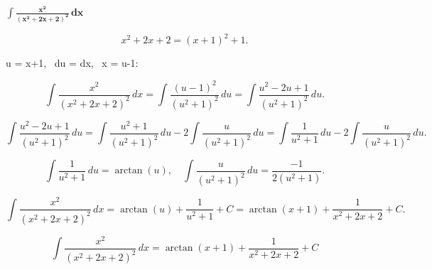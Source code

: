 $\displaystyle \mathbf{\int \frac{x^{2}}{(x^{2}+2x+2)^{2}}\,dx}$

\nopagebreak
{}

$$
x^{2}+2x+2 = (x+1)^{2}+1.
$$

\nopagebreak
{} u = x+1, \ du = dx, \ x = u-1:

$$
\int \frac{x^{2}}{(x^{2}+2x+2)^{2}}\,dx
= \int \frac{(u-1)^{2}}{(u^{2}+1)^{2}}\,du
= \int \frac{u^{2}-2u+1}{(u^{2}+1)^{2}}\,du.
$$

\nopagebreak
{}

$$
\int \frac{u^{2}-2u+1}{(u^{2}+1)^{2}}\,du
= \int \frac{u^{2}+1}{(u^{2}+1)^{2}}\,du - 2\int \frac{u}{(u^{2}+1)^{2}}\,du
= \int \frac{1}{u^{2}+1}\,du - 2\int \frac{u}{(u^{2}+1)^{2}}\,du.
$$

\nopagebreak
{}

$$
\int \frac{1}{u^{2}+1}\,du = \arctan(u), \quad
\int \frac{u}{(u^{2}+1)^{2}}\,du = \frac{-1}{2(u^{2}+1)}.
$$

\nopagebreak
{}

$$
\int \frac{x^{2}}{(x^{2}+2x+2)^{2}}\,dx
= \arctan(u) + \frac{1}{u^{2}+1} + C
= \arctan(x+1) + \frac{1}{x^{2}+2x+2} + C.
$$

\nopagebreak
\[
\boxed{\displaystyle
\int \frac{x^{2}}{(x^{2}+2x+2)^{2}}\,dx
= \arctan(x+1) + \frac{1}{x^{2}+2x+2} + C}
\]
